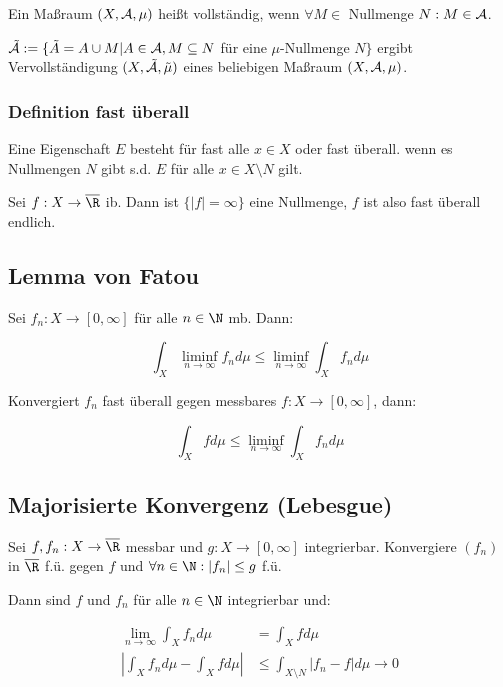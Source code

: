 Ein Maßraum $(X,\mathcal{A},\mu)$ heißt vollständig, wenn $\forall M \in$ Nullmenge $N : M \in \mathcal{A}$.

\vspace{2mm}

$\tilde {\mathcal{A}} := \{ \tilde A = A \cup M | A \in \mathcal{A}, M \subseteq N$ für eine $\mu$-Nullmenge $N\}$ ergibt Vervollständigung $(X,\tilde{\mathcal{A}},\tilde\mu)$ eines beliebigen Maßraum $(X,\mathcal{A},\mu)$.

\subsubsection*{Definition fast überall}

Eine Eigenschaft $E$ besteht für fast alle $x \in X$ oder fast überall. wenn es Nullmengen $N$ gibt s.d. $E$ für alle $x \in X \setminus N$ gilt.

\vspace{2mm}

Sei $f : X \to \overline\R$ ib. Dann ist $\{|f|=\infty\}$ eine Nullmenge, $f$ ist also fast überall endlich.

\subsection*{Lemma von Fatou}

Sei $f_n : X \to [0,\infty]$ für alle $n \in \N$ mb. Dann:

\vspace{-2mm}
$$\int_X \liminf_{n \to \infty} f_n d\mu \leq \liminf_{n \to \infty} \int_X f_n d\mu$$

Konvergiert $f_n$ fast überall gegen messbares $f : X \to [0,\infty]$, dann:

\vspace{-2mm}
$$\int_X f d\mu \leq \liminf_{n \to \infty} \int_X f_n d\mu$$

\subsection*{Majorisierte Konvergenz (Lebesgue)}

Sei $f, f_n : X \to \overline\R$ messbar und $g : X \to [0,\infty]$ integrierbar. Konvergiere $(f_n)$ in $\overline\R$ f.ü. gegen $f$ und $\forall n \in \N : |f_n| \leq g$ f.ü.

Dann sind $f$ und $f_n$ für alle $n \in \N$ integrierbar und:

\vspace{-4mm}
\begin{align*}
	\lim_{n \to \infty} \int_X f_n d\mu &= \int_X f d\mu \\
	|\int_X f_n d\mu - \int_X f d\mu| &\leq \int_{X \setminus N} |f_n - f| d\mu \to 0
\end{align*}


